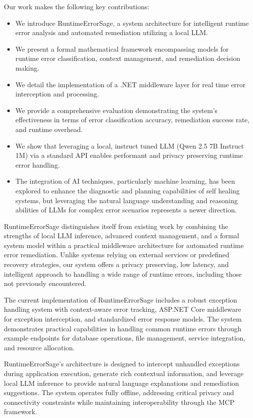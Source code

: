 Our work makes the following key contributions:
\begin{itemize}
\item We introduce RuntimeErrorSage, a system architecture for intelligent runtime error analysis and automated remediation utilizing a local LLM.
\item We present a formal mathematical framework encompassing models for runtime error classification, context management, and remediation decision making.
\item We detail the implementation of a .NET middleware layer for real time error interception and processing.
\item We provide a comprehensive evaluation demonstrating the system's effectiveness in terms of error classification accuracy, remediation success rate, and runtime overhead.
\item We show that leveraging a local, instruct tuned LLM (Qwen 2.5 7B Instruct 1M) via a standard API enables performant and privacy preserving runtime error handling.
\item The integration of AI techniques, particularly machine learning, has been explored to enhance the diagnostic and planning capabilities of self healing systems, but leveraging the natural language understanding and reasoning abilities of LLMs for complex error scenarios represents a newer direction.
\end{itemize}

RuntimeErrorSage distinguishes itself from existing work by combining the strengths of local LLM inference, advanced context management, and a formal system model within a practical middleware architecture for automated runtime error remediation. Unlike systems relying on external services or predefined recovery strategies, our system offers a privacy preserving, low latency, and intelligent approach to handling a wide range of runtime errors, including those not previously encountered.

The current implementation of RuntimeErrorSage includes a robust exception handling system with context-aware error tracking, ASP.NET Core middleware for exception interception, and standardized error response models. The system demonstrates practical capabilities in handling common runtime errors through example endpoints for database operations, file management, service integration, and resource allocation.

RuntimeErrorSage's architecture is designed to intercept unhandled exceptions during application execution, generate rich contextual information, and leverage local LLM inference to provide natural language explanations and remediation suggestions. The system operates fully offline, addressing critical privacy and connectivity constraints while maintaining interoperability through the MCP framework.

